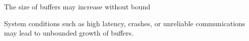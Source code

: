 \documentclass[10pt, xcolor={usenames, dvipsnames}]{beamer}
\begin{document}
\begin{frame}{The size of buffers may increase without bound}

  System conditions such as high latency, crashes, or unreliable communications
  may lead to unbounded growth of buffers.

  \begin{minipage}{0.98\textwidth}
    \begin{center}
      
    \end{center}
  \end{minipage}
  \begin{minipage}{0.98\textwidth}
    \begin{center}
      
    \end{center}
  \end{minipage}
  \begin{minipage}{0.98\textwidth}
    \begin{center}
      
    \end{center}
  \end{minipage}

  
\end{frame}
\end{document}
